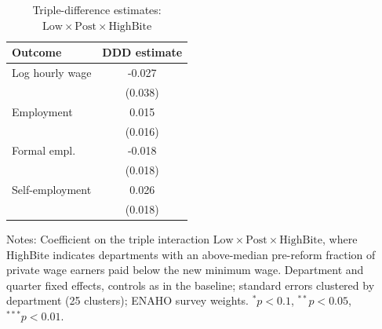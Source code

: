 \begin{table}[H]\centering
\caption{Triple-difference estimates: $\mathrm{Low}\times\mathrm{Post}\times\mathrm{HighBite}$}\label{tab:ddd}
\begin{threeparttable}
\begin{tabular}{lc}
\toprule
Outcome & DDD estimate \\
\midrule
Log hourly wage & -0.027 \\
 & (0.038) \\
Employment & 0.015 \\
 & (0.016) \\
Formal empl. & -0.018 \\
 & (0.018) \\
Self-employment & 0.026 \\
 & (0.018) \\
\bottomrule
\end{tabular}
\begin{tablenotes}\footnotesize
\item Notes: Coefficient on the triple interaction $\mathrm{Low}\times\mathrm{Post}\times\mathrm{HighBite}$, where HighBite indicates departments with an above-median pre-reform fraction of private wage earners paid below the new minimum wage. Department and quarter fixed effects, controls as in the baseline; standard errors clustered by department (25 clusters); ENAHO survey weights. $^{*}p<0.1$, $^{**}p<0.05$, $^{***}p<0.01$.
\end{tablenotes}
\end{threeparttable}\end{table}

